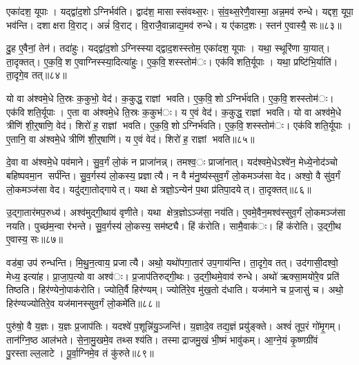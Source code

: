 एका॑दश॒ यूपाः। यद्द्वा॑द॒शोऽग्निर्भव॑ति। द्वाद॑श॒ मासास्संवथ्स॒रः। सं॒व॒थ्स॒रेणै॒वास्मा॒ अन्न॒मव॑ रुन्धे। यद्दश॒ यूपा॒ भव॑न्ति। दशाक्षरा वि॒राट्। अन्नं॑ वि॒राट्। वि॒राजै॒वान्नाद्य॒मव॑ रुन्धे। य ए॑काद॒शः। स्तन॑ ए॒वास्यै॒ सः॥८३॥

दु॒ह ए॒वैनां॒ तेन॑। तदा॑हुः। यद्द्वा॑द॒शोऽग्निस्स्याद्द्वाद॒शस्स्तोम॒ एका॑दश॒ यूपाः। यथा॒ स्थूरि॑णा या॒यात्। ता॒दृक्तत्। ए॒क॒वि॒श ए॒वाग्निस्स्या॒दित्या॑हुः। ए॒क॒वि॒शस्स्तोम॑ः। एक॑विशति॒र्यूपाः। यथा॒ प्रष्टि॑भि॒र्याति॑। ता॒दृगे॒व तत्॥८४॥

यो वा अ॑श्वमे॒धे ति॒स्रः क॒कुभो॒ वेद॑। क॒कुद्ध॒ राज्ञां भवति। ए॒क॒वि॒शोऽग्निर्भ॑वति। ए॒क॒वि॒शस्स्तोम॑ः। एक॑विशति॒र्यूपाः। ए॒ता वा अ॑श्वमे॒धे ति॒स्रः क॒कुभ॑ः। य ए॒वं वेद॑। क॒कुद्ध॒ राज्ञां भवति। यो वा अश्व॑मे॒धे त्रीणि॑ शी॒र्॒षाणि॒ वेद॑। शिरो॑ ह॒ राज्ञां भवति। ए॒क॒वि॒शोऽग्निर्भ॑वति। ए॒क॒वि॒शस्स्तोम॑ः। एक॑विशति॒र्यूपाः। ए॒तानि॒ वा अ॑श्वमे॒धे त्रीणि॑ शी॒र्॒षाणि॑। य ए॒वं वेद॑। शिरो॑ ह॒ राज्ञां भवति॥८५॥


दे॒वा वा अ॑श्वमे॒धे पव॑माने। सु॒व॒र्गं लो॒कं न प्राजा॑नन्न्। तमश्व॒ः प्राजा॑नात्। यद॑श्वमे॒धेऽश्वे॑न॒ मेध्ये॒नोद॑ञ्चो बहिष्पवमा॒न सर्प॑न्ति। सु॒व॒र्गस्य॑ लो॒कस्य॒ प्रज्ञात्यै। न वै म॑नु॒ष्य॑स्सुव॒र्गं लो॒कमञ्ज॑सा वेद। अश्वो॒ वै सु॑व॒र्गं लो॒कमञ्ज॑सा वेद। यदु॑द्गा॒तोद्गायेत्। यथा क्षेत्रज्ञो॒ऽन्येन॑ प॒था प्र॑तिपा॒दयेत्। ता॒दृक्तत्॥८६॥

उ॒द्गा॒तार॑मप॒रुध्य॑। अश्व॑मुद्गी॒थाय॑ वृणीते। यथा क्षेत्र॒ज्ञोऽञ्ज॑सा॒ नय॑ति। ए॒वमे॒वैन॒मश्व॑स्सुव॒र्गं लो॒कमञ्ज॑सा नयति। पुच्छ॑म॒न्वा र॑भन्ते। सु॒व॒र्गस्य॑ लो॒कस्य॒ सम॑ष्ट्यै। हिं क॑रोति। सामै॒वाक॑ः। हिं क॑रोति। उ॒द्गी॒थ ए॒वास्य॒ सः॥८७॥

वड॑बा॒ उप॑ रुन्धन्ति। मि॒थु॒न॒त्वाय॒ प्रजात्यै। अथो॒ यथो॑पगा॒तार॑ उप॒गाय॑न्ति। ता॒दृगे॒व तत्। उद॑गासी॒दश्वो॒ मेध्य॒ इत्या॑ह। प्रा॒जा॒प॒त्यो वा अश्व॑ः। प्र॒जाप॑तिरुद्गी॒थः। उ॒द्गी॒थमे॒वाव॑ रुन्धे। अथो॑ ऋक्सा॒मयो॑रे॒व प्रति॑ तिष्ठति। हिर॑ण्येनो॒पाक॑रोति। ज्योति॒र्वै हिर॑ण्यम्। ज्योति॑रे॒व मु॑ख॒तो द॑धाति। यज॑माने च प्र॒जासु॑ च। अथो॒ हिर॑ण्यज्योतिरे॒व यज॑मानस्सुव॒र्गं लो॒कमे॑ति॥८८॥


पुरु॑षो॒ वै य॒ज्ञः। य॒ज्ञः प्र॒जाप॑तिः। यदश्वे॑ प॒शून्नि॑यु॒ञ्जन्ति॑। य॒ज्ञादे॒व तद्य॒ज्ञं प्रयु॑ङ्क्ते। अश्वं॑ तूप॒रं गो॑मृ॒गम्। तान॑ग्नि॒ष्ठ आल॑भते। से॒ना॒मु॒खमे॒व तथ्सश्य॑ति। तस्माद्राजमु॒खं भी॒ष्मं भावु॑कम्। आ॒ग्ने॒यं कृ॒ष्णग्री॑वं पु॒रस्ताल्ल॒लाटे। पू॒र्वा॒ग्निमे॒व तं कु॑रुते॥८९॥

